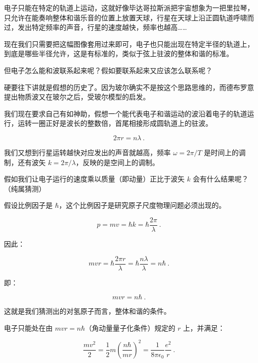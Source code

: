 电子只能在特定的轨道上运动，这就好像毕达哥拉斯派把宇宙想象为一把里拉琴，只允许在能奏响整体和谐乐音的位置上放置天球，行星在天球上沿正圆轨道呼啸而过，发出特定频率的声音，行星的速度越快，频率也越高……

现在我们只需要把这幅图像套用过来即可，电子也只能出现在特定半径的轨道上，到底是哪些半径允许，这是有标准的，类似于弦上驻波的整体和谐的标准。


但电子怎么能和波联系起来呢？假如要联系起来又应该怎么联系呢？

硬要往下讲就是假想的历史了。因为玻尔确实不是按这个思路思维的，而德布罗意提出物质波又在玻尔之后，受玻尔模型的启发。

我们现在要求自己有如神助，假想一个能代表电子和谐运动的波沿着电子的轨道运行，运转一圈正好是波长的整数倍，首尾相接形成圆轨道上的驻波。

\begin{equation}
2 \pi r = n \lambda~.
\end{equation}

我们又想到行星运转越快对应发出的声音就越高，频率 $\omega = 2 \pi /T$ 是时间上的调制，还有波矢 $k = 2 \pi / \lambda$，反映的是空间上的调制。

假如我们让电子运行的速度乘以质量（即动量）正比于波矢 $k$ 会有什么结果呢？（纯属猜测）

假设比例因子是 $\hbar$，这个比例因子是研究原子尺度物理问题必须出现的。

\begin{equation}
p = m v = \hbar k = \hbar \frac{2 \pi }{\lambda}~.
\end{equation}

因此：

\begin{equation}
m v r = \hbar \frac{2 \pi r}{\lambda} = \hbar \frac{ n \lambda }{ \lambda} = n \hbar~.
\end{equation}

即：

\begin{equation}
mvr = n \hbar ~.
\end{equation}

这就是我们猜测出的对氢原子而言，整体和谐的条件。

电子只能处在由 $mvr=n \hbar$（角动量量子化条件）规定的 $r$ 上，并满足：

\begin{equation}
\frac{m v^2}{2} = \frac{1}{2} m \left(  \frac{ n \hbar  }{ m r }  \right)^2 = \frac{1}{8 \pi \epsilon_0 } \frac{e^2 }{r }  ~.
\end{equation}

